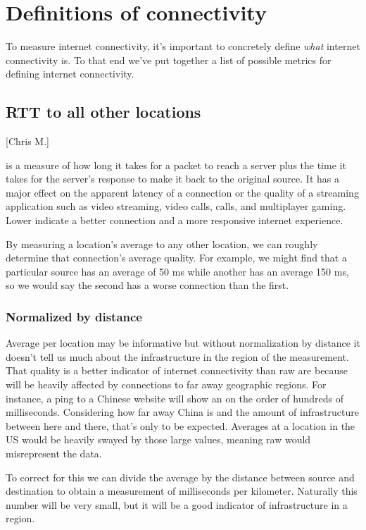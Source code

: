 \section{Definitions of connectivity}

To measure internet connectivity, it's important to concretely define \textit{what} internet connectivity is. To that end we've put together a list of possible metrics for defining internet connectivity.

\subsection{RTT to all other locations}[Chris M.]
\label{sec:raw-rtt-everything}

\RTT is a measure of how long it takes for a packet to reach a server plus the time it takes for the server's response to make it back to the original source. It has a major effect on the apparent latency of a connection or the quality of a streaming application such as video streaming, video calls, \voip calls, and multiplayer gaming. Lower \rtts indicate a better connection and a more responsive internet experience.

By measuring a location's average \rtt to any other location, we can roughly determine that connection's average quality. For example, we might find that a particular source has an average \rtt of 50 ms while another has an average 150 ms, so we would say the second has a worse connection than the first.

\subsubsection{Normalized by distance}

Average \rtt per location may be informative but without normalization by distance it doesn't tell us much about the infrastructure in the region of the measurement. That quality is a better indicator of internet connectivity than raw \rtts are because \rtts will be heavily affected by connections to far away geographic regions. For instance, a ping to a Chinese website will show an \rtt on the order of hundreds of milliseconds. Considering how far away China is and the amount of infrastructure between here and there, that's only to be expected. Averages at a location in the US would be heavily swayed by those large values, meaning raw \rtt would misrepresent the data.

To correct for this we can divide the average \rtt by the distance between source and destination to obtain a measurement of milliseconds per kilometer. Naturally this number will be very small, but it will be a good indicator of infrastructure in a region.

